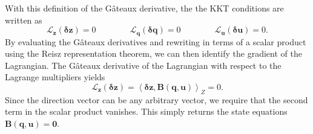 With this definition of the G\^{a}teaux derivative, the the KKT conditions are written as 
\begin{equation}
\mathcal{L}_\mathbf{z}(\boldsymbol \delta \mathbf{z}) = 0 \qquad \qquad \mathcal{L}_\mathbf{q}(\boldsymbol \delta \mathbf{q}) = 0 \qquad \qquad \mathcal{L}_\mathbf{u}(\boldsymbol \delta \mathbf{u}) = 0.
\end{equation}
By evaluating the G\^{a}teaux derivatives and rewriting in terms of a scalar product using the Reisz representation theorem, we can then identify the gradient of the Lagrangian. The G\^{a}teaux derivative of the Lagrangian with respect to the Lagrange multipliers yields
\begin{equation}
\mathcal{L}_\mathbf{z}(\boldsymbol \delta \mathbf{z}) = \left \langle \boldsymbol \delta \mathbf{z}, \mathbf{B}(\mathbf{q}, \mathbf{u})\right \rangle_Z = 0.
\end{equation}
Since the direction vector can be any arbitrary vector, we require that the second term in the scalar product vanishes. This simply returns the state equations $\mathbf{B}(\mathbf{q}, \mathbf{u}) = \mathbf{0}$.

